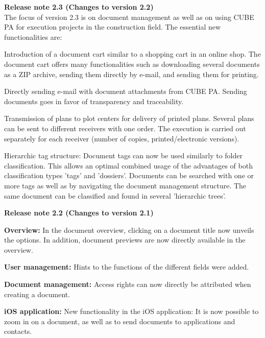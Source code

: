 \vspace{\baselineskip}

\textbf{Release note 2.3 (Changes to version 2.2)} \\

The focus of version 2.3 is on document management as well as on using CUBE PA for execution projects in the construction field. The essential new functionalities are:
\begin{compactitem}
	\item Introduction of a document cart similar to a shopping cart in an online shop. The document cart offers many functionalities such as downloading several documents as a ZIP archive, sending them directly by e-mail, and sending them for printing.
	\item Directly sending e-mail with document attachments from CUBE PA. Sending documents goes in favor of transparency and traceability.
	\item Transmission of plans to plot centers for delivery of printed plans. Several plans can be sent to different receivers with one order. The execution is carried out separately for each receiver (number of copies, printed/electronic versions).
	\item Hierarchic tag structure: Document tags can now be used similarly to folder classification. This allows an optimal combined usage of the advantages of both classification types 'tags' and 'dossiers'. Documents can be searched with one or more tags as well as by navigating the document management structure. The same document can be classified and found in several 'hierarchic trees'.
\end{compactitem}

\vspace{\baselineskip}

\textbf{Release note 2.2 (Changes to version 2.1)} \\

\begin{compactitem}
	\item \textbf{Overview:} In the document overview, clicking on a document title now unveils the options. In addition, document previews are now directly available in the overview.
	\item \textbf{User management:} Hints to the functions of the different fields were added.
	\item \textbf{Document management:} Access rights can now directly be attributed when creating a document.
	\item \textbf{iOS application:} New functionality in the iOS application: It is now possible to zoom in on a document, as well as to send documents to applications and contacts.
\end{compactitem}

